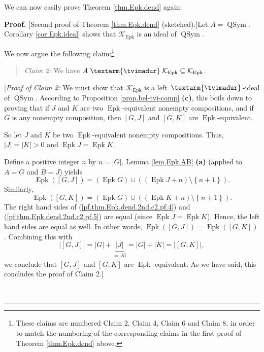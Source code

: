 \documentclass[numbers=enddot,12pt,final,onecolumn,notitlepage]{scrartcl}%
\theoremstyle{definition}
\newenvironment{statement}{\begin{quote}}{\end{quote}}
\newenvironment{proof}[1][Proof]{\noindent\textbf{#1.} }{\ \rule{0.5em}{0.5em}}
\newenvironment{verlong}{}{}
\newcommand{\tvi}{\left. \textarm{\tvimadur} \right.}
\begin{document}
\begin{verlong}
We can now easily prove Theorem \ref{thm.Epk.dend} again:

\begin{proof}
[Second proof of Theorem \ref{thm.Epk.dend} (sketched).]Let
$A=\operatorname*{QSym}$. Corollary \ref{cor.Epk.ideal} shows that
$\mathcal{K}_{\operatorname*{Epk}}$ is an ideal of $\operatorname*{QSym}$.

We now argue the following claim:\footnote{These claims are numbered Claim 2,
Claim 4, Claim 6 and Claim 8, in order to match the numbering of the
corresponding claims in the first proof of Theorem \ref{thm.Epk.dend} above.}

\begin{statement}
\textit{Claim 2:} We have $A\tvi\mathcal{K}_{\operatorname*{Epk}}%
\subseteq\mathcal{K}_{\operatorname*{Epk}}$.
\end{statement}

[\textit{Proof of Claim 2:} We must show that $\mathcal{K}%
_{\operatorname*{Epk}}$ is a left $\tvi$-ideal of $\operatorname*{QSym}$.
According to Proposition \ref{prop.bel-tvi-comp} \textbf{(c)}, this boils down
to proving that if $J$ and $K$ are two $\operatorname*{Epk}$-equivalent
nonempty compositions, and if $G$ is any nonempty composition, then $\left[
G,J\right]  $ and $\left[  G,K\right]  $ are $\operatorname*{Epk}$-equivalent.

So let $J$ and $K$ be two $\operatorname*{Epk}$-equivalent nonempty
compositions. Thus, $\left\vert J\right\vert =\left\vert K\right\vert >0$ and
$\operatorname*{Epk}J=\operatorname*{Epk}K$.

Define a positive integer $n$ by $n=\left\vert G\right\vert $. Lemma
\ref{lem.Epk.AB} \textbf{(a)} (applied to $A=G$ and $B=J$) yields
\begin{equation}
\operatorname*{Epk}\left(  \left[  G,J\right]  \right)  =\left(
\operatorname*{Epk}G\right)  \cup\left(  \left(  \operatorname*{Epk}%
J+n\right)  \setminus\left\{  n+1\right\}  \right)  .
\label{pf.thm.Epk.dend.2nd.c2.pf.4}%
\end{equation}
Similarly,%
\begin{equation}
\operatorname*{Epk}\left(  \left[  G,K\right]  \right)  =\left(
\operatorname*{Epk}G\right)  \cup\left(  \left(  \operatorname*{Epk}%
K+n\right)  \setminus\left\{  n+1\right\}  \right)  .
\label{pf.thm.Epk.dend.2nd.c2.pf.5}%
\end{equation}
The right hand sides of (\ref{pf.thm.Epk.dend.2nd.c2.pf.4}) and
(\ref{pf.thm.Epk.dend.2nd.c2.pf.5}) are equal (since $\operatorname*{Epk}%
J=\operatorname*{Epk}K$). Hence, the left hand sides are equal as well. In
other words, $\operatorname*{Epk}\left(  \left[  G,J\right]  \right)
=\operatorname*{Epk}\left(  \left[  G,K\right]  \right)  $. Combining this
with%
\[
\left\vert \left[  G,J\right]  \right\vert =\left\vert G\right\vert
+\underbrace{\left\vert J\right\vert }_{=\left\vert K\right\vert }=\left\vert
G\right\vert +\left\vert K\right\vert =\left\vert \left[  G,K\right]
\right\vert ,
\]
we conclude that $\left[  G,J\right]  $ and $\left[  G,K\right]  $ are
$\operatorname*{Epk}$-equivalent. As we have said, this concludes the proof of
Claim 2.]


\end{proof}
\end{verlong}
\end{document}
